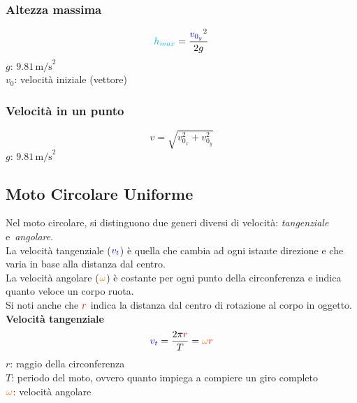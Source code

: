 \subsubsection{Altezza massima}
\begin{equation*}
\mathcolor{cyan}{h_{max}} = \frac{\mathcolor{blue}{v_{0_y}}^2}{2g}
\end{equation*}
\hyperref[tab:g]{$g$}: $9.81\,\text{m/s}^2$\\
$v_0$: velocità iniziale (vettore)

\subsubsection{Velocità in un punto}
\begin{equation*}
v = \sqrt{v_{0_x}^2+v_{0_y}^2}
\end{equation*}
\hyperref[tab:g]{$g$}: $9.81\,\text{m/s}^2$

\subsection{Moto Circolare Uniforme} \label{subsec:mcu}
\begin{center}
\end{center}
Nel moto circolare, si distinguono due generi diversi di velocità: \emph{tangenziale} e\
\emph{angolare}.\\[\baselineskip]
La velocità tangenziale ($\mathcolor{blue}{v_t}$) è quella che cambia ad ogni istante direzione e che varia in base alla distanza dal centro.\\
La velocità angolare ($\mathcolor{orange}{\omega}$) è costante per ogni punto della circonferenza e 
indica quanto veloce un corpo ruota.\\[\baselineskip]
Si noti anche che $\mathcolor{red}{r}$ indica la distanza dal centro di rotazione al corpo in oggetto.
\\[\baselineskip]
\textbf{Velocità tangenziale}
\begin{equation*}
\mathcolor{blue}{v_t} = \frac{2\pi\mathcolor{red}{r}}{T} =
\mathcolor{orange}{\omega}\mathcolor{red}{r}
\end{equation*}
$r$: raggio della circonferenza\\
$T$: periodo del moto, ovvero quanto impiega a compiere un giro completo\\
$\mathcolor{orange}{\omega}$: velocità angolare

